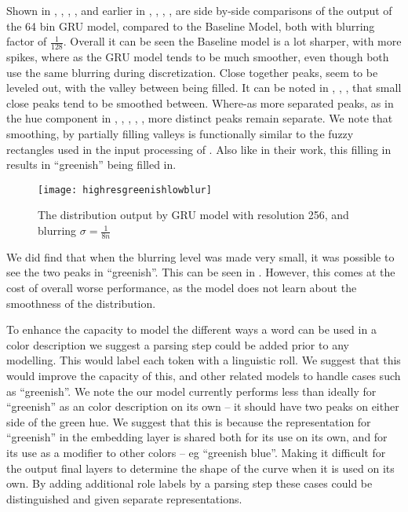 \documentclass[11pt,letterpaper]{article}
\newcommand{\textcite}{\newcite}
\begin{document}
Shown in , , , , and earlier in , , , ,  are side by-side comparisons of the output of the 64 bin GRU model, compared to the Baseline Model, both with blurring factor of $\frac{1}{128}$.
Overall it can be seen the Baseline model is a lot sharper, with more spikes,
where as the GRU model tends to be much smoother, even though both use the same blurring during discretization.
Close together peaks, seem to be leveled out, with the valley between being filled.
It can be noted in , , , that small close peaks tend to be smoothed between.
Where-as more separated peaks, as in the hue component in , , , , , more distinct peaks remain separate.
We note that smoothing, by partially filling valleys is functionally similar to the fuzzy rectangles used in the input processing of \textcite{mcmahan2015bayesian}.
Also like in their work, this filling in results in ``greenish'' being filled in.

\begin{figure}
	
	\texttt{[image: highresgreenishlowblur]}
	\caption{\label{fighighresgreenishlowblur} The distribution output by GRU model with resolution 256, and blurring $\sigma=\frac{1}{8n}$}
\end{figure}
We did find that when the blurring level was made very small, it was possible to see the two peaks in ``greenish''.
This can be seen in .
However, this comes at the cost of overall worse performance, as the model does not learn about the smoothness of the distribution.





To enhance the capacity to model the different ways a word can be used in a color description we suggest a parsing step could be added prior to any modelling.
This would label each token with a linguistic roll.
We suggest that this would improve the capacity of this, and other related models to handle cases such as ``greenish''.
We note the our model currently performs less than ideally for ``greenish'' as an color description on its own -- it should have two peaks on either side of the green hue.
We suggest that this is because the representation for ``greenish'' in the embedding layer is shared both for its use on its own, and for its use as a modifier to other colors -- eg ``greenish blue''.
Making it difficult for the output final layers to determine the shape of the curve when it is used on its own.
By adding additional role labels by a parsing step these cases could be distinguished and given separate representations.
\end{document}
